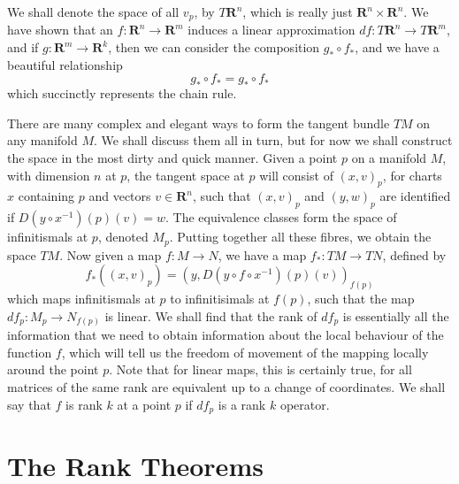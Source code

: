 We shall denote the space of all $v_p$, by $T\mathbf{R}^n$, which is really just $\mathbf{R}^n \times \mathbf{R}^n$. We have shown that an $f: \mathbf{R}^n \to \mathbf{R}^m$ induces a linear approximation $df: T\mathbf{R}^n \to T\mathbf{R}^m$, and if $g: \mathbf{R}^m \to \mathbf{R}^k$, then we can consider the composition $g_* \circ f_*$, and we have a beautiful relationship
%
\[ g_* \circ f_* = g_* \circ f_* \]
%
which succinctly represents the chain rule.

There are many complex and elegant ways to form the tangent bundle $TM$ on any manifold $M$. We shall discuss them all in turn, but for now we shall construct the space in the most dirty and quick manner. Given a point $p$ on a manifold $M$, with dimension $n$ at $p$, the tangent space at $p$ will consist of $(x,v)_p$, for charts $x$ containing $p$ and vectors $v \in \mathbf{R}^n$, such that $(x,v)_p$ and $(y,w)_p$ are identified if $D(y \circ x^{-1})(p)(v) = w$. The equivalence classes form the space of infinitismals at $p$, denoted $M_p$. Putting together all these fibres, we obtain the space $TM$. Now given a map $f: M \to N$, we have a map $f_*: TM \to TN$, defined by
%
\[ f_*((x,v)_p) = (y,D(y \circ f \circ x^{-1})(p)(v))_{f(p)} \]
%
which maps infinitismals at $p$ to infinitisimals at $f(p)$, such that the map $df_p: M_p \to N_{f(p)}$ is linear. We shall find that the rank of $df_p$ is essentially all the information that we need to obtain information about the local behaviour of the function $f$, which will tell us  the freedom of movement of the mapping locally around the point $p$. Note that for linear maps, this is certainly true, for all matrices of the same rank are equivalent up to a change of coordinates. We shall say that $f$ is rank $k$ at a point $p$ if $df_p$ is a rank $k$ operator.

\section{The Rank Theorems}

